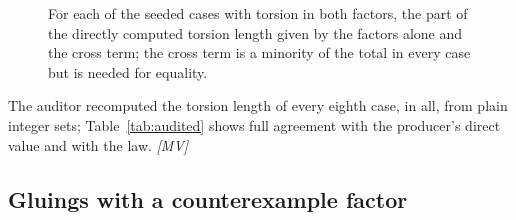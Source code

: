 \documentclass[11pt]{article}
\theoremstyle{definition}
\theoremstyle{remark}
\newcommand{\tor}{\tau}
\newcommand{\len}{\ell}
\newcommand{\mMV}{\emph{[MV]}}
\begin{document}
\begin{figure}[t]
\centering
{}
\caption{For each of the \NSeededCross{} seeded cases with torsion in both factors, the part of the directly computed torsion length given by the factors alone and the cross term; the cross term is
a minority of the total in every case but is needed for equality.}\label{fig:cross}
\end{figure}

The auditor recomputed the torsion length of every eighth case, \NAudited{} in all, from plain integer sets; Table~\ref{tab:audited} shows full agreement with the producer's direct value and with the law.
\mMV{}

\begin{table}[t]
\centering\footnotesize

\caption{The \NAudited{} seeded cases (every eighth case) whose torsion length was recomputed by the independent implementation: auditor value, producer direct value and the value from the law, which agree in every row.}\label{tab:audited}
\end{table}

\subsection{Gluings with a counterexample factor}
\end{document}
